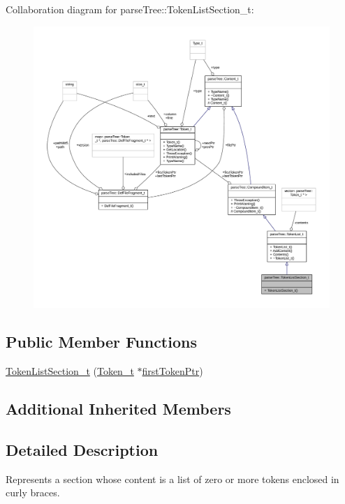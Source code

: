 Collaboration diagram for parse\+Tree\+:\+:Token\+List\+Section\+\_\+t\+:
\nopagebreak
\begin{figure}[H]
\begin{center}
\leavevmode
\includegraphics[width=350pt]{structparse_tree_1_1_token_list_section__t__coll__graph}
\end{center}
\end{figure}
\subsection*{Public Member Functions}
\begin{DoxyCompactItemize}
\item 
\hyperlink{structparse_tree_1_1_token_list_section__t_aced6cbf7c92b910ee8ea58b19b1d7218}{Token\+List\+Section\+\_\+t} (\hyperlink{structparse_tree_1_1_token__t}{Token\+\_\+t} $\ast$\hyperlink{structparse_tree_1_1_compound_item__t_a587020c943e760cb0152dd8cd31e21ef}{first\+Token\+Ptr})
\end{DoxyCompactItemize}
\subsection*{Additional Inherited Members}


\subsection{Detailed Description}
Represents a section whose content is a list of zero or more tokens enclosed in curly braces. 

